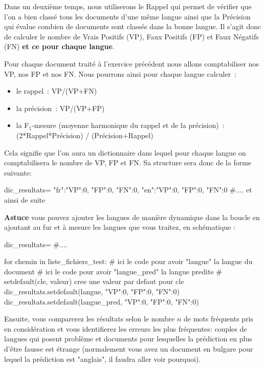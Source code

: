 Dans un deuxième temps, nous utiliserons le Rappel qui permet de vérifier que l'on a bien classé tous les documents d'une même langue ainsi que la Précision qui évalue combien de documents sont classés dans la bonne langue. 
 Il s'agit donc de calculer le nombre de Vrais Positifs (VP), Faux Positifs (FP) et Faux Négatifs (FN) \textbf{et ce pour chaque langue}.

Pour chaque document traité à l'exercice précédent nous allons comptabiliser nos VP, nos FP et nos FN.
 Nous pourrons ainsi pour chaque langue calculer :
\begin{itemize}
\item le rappel : VP/(VP+FN)
\item la précision : VP/(VP+FP)
\item la F$_1$-mesure (moyenne harmonique du rappel et de la précision) : (2*Rappel*Précision) / (Précision+Rappel)
\end{itemize}

Cela signifie que l'on aura un dictionnaire dans lequel pour chaque langue on comptabilisera le nombre de VP, FP et FN. Sa structure sera donc de la forme suivante:
\begin{python}
dic_resultats= {
  "fr":{"VP":0, "FP":0, "FN":0},
  "en":{"VP":0, "FP":0, "FN":0}
  #.... et ainsi de suite
}
\end{python}

\textbf{Astuce} vous pouvez ajouter les langues de manière dynamique dans la boucle en ajoutant au fur et à mesure les langues que vous traitez, en schématique : 

\begin{python}

dic_resultats= {}
#....

for chemin in liste_fichiers_test:
  # ici le code pour avoir "langue" la langue du document
  # ici le code pour avoir "langue_pred" la langue predite
  # setdefault(cle, valeur) cree une valeur par defaut pour cle 
  dic_resultats.setdefault(langue, {"VP":0, "FP":0, "FN":0})
  dic_resultats.setdefault(langue_pred, {"VP":0, "FP":0, "FN":0})
\end{python}

Ensuite, vous comparerez les résultats selon le nombre $n$ de mots fréquents pris en considération et vous identifierez les erreurs les plus fréquentes: couples de langues qui posent problème et documents pour lesquelles la prédiction en plus d'être fausse est étrange (normalement vous avez un document en bulgare pour lequel la prédiction est "anglais", il faudra aller voir pourquoi).

